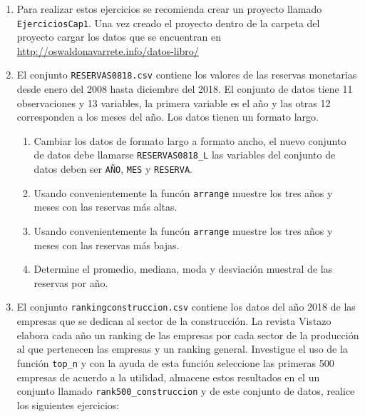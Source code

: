 \documentclass[letterpaper,]{book}
\providecommand{\tightlist}{%
  \setlength{\itemsep}{0pt}\setlength{\parskip}{0pt}}
\begin{document}
\begin{enumerate}
\def\labelenumi{\arabic{enumi}.}
\setcounter{enumi}{-1}
\item
  Para realizar estos ejercicios se recomienda crear un proyecto llamado \texttt{EjerciciosCap1}. Una vez creado el proyecto dentro de la carpeta del proyecto cargar los datos que se encuentran en \url{http://oswaldonavarrete.info/datos-libro/}
\item
  El conjunto \texttt{RESERVAS0818.csv} contiene los valores de las reservas monetarias desde enero del 2008 hasta diciembre del 2018. El conjunto de datos tiene 11 observaciones y 13 variables, la primera variable es el año y las otras 12 corresponden a los meses del año. Los datos tienen un formato largo.

  \begin{enumerate}
  \def\labelenumii{\alph{enumii}.}
  \tightlist
  \item
    Cambiar los datos de formato largo a formato ancho, el nuevo conjunto de datos debe llamarse \texttt{RESERVAS0818\_L} las variables del conjunto de datos deben ser \texttt{AÑO}, \texttt{MES} y \texttt{RESERVA}.
  \item
    Usando convenientemente la funcón \texttt{arrange} muestre los tres años y meses con las reservas más altas.
  \item
    Usando convenientemente la funcón \texttt{arrange} muestre los tres años y meses con las reservas más bajas.
  \item
    Determine el promedio, mediana, moda y desviación muestral de las reservas por año.
  \end{enumerate}
\item
  El conjunto \texttt{rankingconstruccion.csv} contiene los datos del año 2018 de las empresas que se dedican al sector de la construcción. La revista Vistazo elabora cada año un ranking de las empresas por cada sector de la producción al que pertenecen las empresas y un ranking general. Investigue el uso de la función \texttt{top\_n} y con la ayuda de esta función seleccione las primeras 500 empresas de acuerdo a la utilidad, almacene estos resultados en el un conjunto llamado \texttt{rank500\_construccion} y de este conjunto de datos, realice los siguientes ejercicios:


\end{enumerate}
\end{document}
